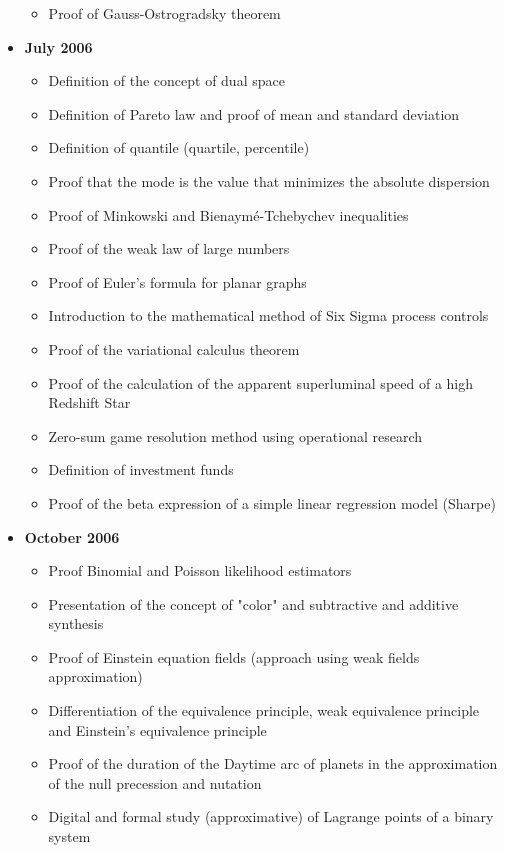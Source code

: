 \documentclass[12pt,a4paper,twoside,openright]{report}
\theoremstyle{definition}
\theoremstyle{itexmp}
\numberwithin{equation}{section}
\begin{document}
\begin{itemize}
\begin{itemize}[noitemsep]
			\item Proof of Gauss-Ostrogradsky theorem 
		\end{itemize}
	\item \textbf{July 2006}
		\begin{itemize}[noitemsep]
			\item Definition of the concept of dual space
			\item Definition of Pareto law and proof of mean and standard deviation
			\item Definition of quantile (quartile, percentile)
			\item Proof that the mode is the value that minimizes the absolute dispersion
			\item Proof of Minkowski and Bienaymé-Tchebychev inequalities
			\item Proof of the weak law of large numbers 
			\item Proof of Euler's formula for planar graphs
			\item Introduction to the mathematical method of Six Sigma process controls
			\item Proof of the variational calculus theorem
			\item Proof of the calculation of the apparent superluminal speed of a high Redshift Star
			\item Zero-sum game resolution method using operational research
			\item Definition of investment funds
			\item Proof of the beta expression of a simple linear regression model (Sharpe)				
		\end{itemize}
	\item \textbf{October 2006}
		\begin{itemize}[noitemsep]
			\item Proof Binomial and Poisson likelihood estimators
			\item Presentation of the concept of "color" and subtractive and additive synthesis
			\item Proof of Einstein equation fields (approach using weak fields approximation)
			\item Differentiation of the equivalence principle, weak equivalence principle and Einstein's equivalence principle
			\item Proof of the duration of the Daytime arc of planets in the approximation of the null precession and nutation
			\item Digital and formal study (approximative) of Lagrange points of a binary system

\end{itemize}
\end{itemize}
\end{document}
